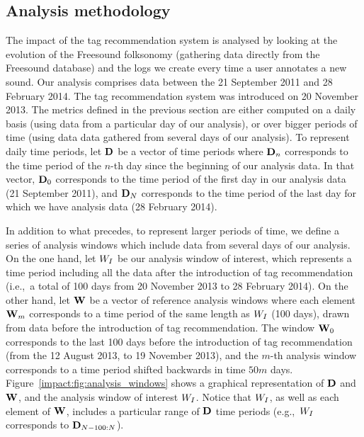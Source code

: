\subsection{Analysis methodology}
\label{impact:sec:analysis_methodology}

The impact of the tag recommendation system is analysed by looking at the evolution of the Freesound folksonomy (gathering data directly from the Freesound database) and the logs we create every time a user annotates a new sound. Our analysis comprises data between the 21 September 2011 and 28 February 2014. The tag recommendation system was introduced on 20 November 2013. The metrics defined in the previous section are either computed on a daily basis (using data from a particular day of our analysis), or over bigger periods of time (using data data gathered from several days of our analysis). To represent daily time periods, let $\mathbf{\mathbf{D}}$ be a vector of time periods where $\mathbf{D}_{n}$ corresponds to the time period of the $n$-th day since the beginning of our analysis data. In that vector, $\mathbf{D}_{0}$ corresponds to the time period of the first day in our analysis data (21 September 2011), and $\mathbf{D}_{N}$ corresponds to the time period of the last day for which we have analysis data (28 February 2014). 

In addition to what precedes, to represent larger periods of time, we define a series of analysis windows which include data from several days of our analysis. On the one hand, let $W_I$ be our analysis window of interest, which represents a time period including all the data after the introduction of tag recommendation (i.e.,~a total of 100 days from 20 November 2013 to 28 February 2014). On the other hand, let $\mathbf{W}$ be a vector of reference analysis windows where each element $\mathbf{W}_{m}$ corresponds to a time period of the same length as $W_I$ (100 days), drawn from data before the introduction of tag recommendation. The window $\mathbf{W}_{0}$ corresponds to the last 100 days before the introduction of tag recommendation (from the 12 August 2013, to 19 November 2013), and the $m$-th analysis window corresponds to a time period shifted backwards in time $50m$ days. Figure~\ref{impact:fig:analysis_windows} shows a graphical representation of $\mathbf{\mathbf{D}}$ and $\mathbf{W}$, and the analysis window of interest $W_I$. Notice that $W_I$, as well as each element of $\mathbf{W}$, includes a particular range of $\mathbf{D}$ time periods (e.g.,~$W_I$ corresponds to $\mathbf{D}_{N-100:N}$).

